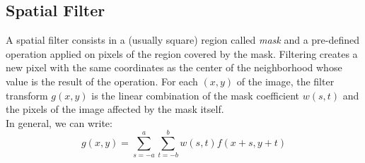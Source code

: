 \documentclass{standalone}
\begin{document}
\subsection{Spatial Filter}

A spatial filter consists in a (usually square) region called \textit{mask}  and a pre-defined operation applied on pixels of the region covered by the mask\cite{corrandconv}.
Filtering creates a new pixel with the same coordinates as the center of the neighborhood whose value is the result of the operation.
For each $(x, y)$ of the image, the filter transform $g(x, y)$ is the linear combination of the mask coefficient $w(s, t)$ and the pixels of the image affected by the mask itself.
\\
In general, we can write:
\begin{equation}
    g(x, y) = \sum_{s = -a}^{a} \sum_{t = -b}^{b} w(s, t) f(x + s, y + t)
\end{equation}  
\end{document}
